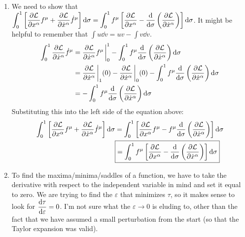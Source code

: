 \documentclass[11pt]{article}
\begin{document}
\begin{enumerate}[label=\alph*)]

\item
We need to show that $\displaystyle{\int_0^1\left[\pdv{\mathcal{L}}{x^\alpha}f^\mu + \pdv{\mathcal{L}}{\dot{x}^\alpha}\dot{f}^\mu\right]\dd{\sigma} = \int_0^1 f^\mu \left[\pdv{\mathcal{L}}{x^\alpha} - \dv{\sigma}\left(\pdv{\mathcal{L}}{\dot{x}^\alpha}\right)\right]\dd{\sigma}}$. It might be helpful to remember that $\displaystyle{\int u\dd{v} = uv -\int v \dd{v}}$.
\begin{align*}
\int_0^1 \pdv{\mathcal{L}}{\dot{x}^\alpha}\dot{f}^\mu & = \pdv{\mathcal{L}}{\dot{x}^\alpha}f^\mu\eval_0^1 - \int_0^1 f^\mu \dv{\sigma}\left(\pdv{\mathcal{L}}{\dot{x}^\alpha}\right)\dd{\sigma}\\
&= \pdv{\mathcal{L}}{\dot{x}^\alpha}\eval_1(0) - \pdv{\mathcal{L}}{\dot{x}^\alpha}\eval_0 (0) - \int_0^1 f^\mu \dv{\sigma}\left(\pdv{\mathcal{L}}{\dot{x}^\alpha}\right)\dd{\sigma}\\
& = - \int_0^1 f^\mu \dv{\sigma}\left(\pdv{\mathcal{L}}{\dot{x}^\alpha}\right)\dd{\sigma}
\end{align*}
Substituting this into the left side of the equation above:
\begin{align*}
\int_0^1\left[\pdv{\mathcal{L}}{x^\alpha}f^\mu + \pdv{\mathcal{L}}{\dot{x}^\alpha}\dot{f}^\mu\right]\dd{\sigma} & = \int_0^1 \left[\pdv{\mathcal{L}}{x^\alpha}f^\mu - f^\mu \dv{\sigma}\left(\pdv{\mathcal{L}}{\dot{x}^\alpha}\right)\right]\dd{\sigma}\\
& \boxed{ = \int_0^1 f^\mu \left[\pdv{\mathcal{L}}{x^\alpha} -\dv{\sigma}\left(\pdv{\mathcal{L}}{\dot{x}^\alpha}\right)\right]\dd{\sigma}}
\end{align*}


\item To find the maxima/minima/saddles of a function, we have to take the derivative with respect to the independent variable in mind and set it equal to zero. We are trying to find the $\varepsilon$ that minimizes $\tau$, so it makes sense to look for $\displaystyle{\dv{\tau}{\varepsilon} = 0}$. I'm not sure what the $\varepsilon \rightarrow 0$ is eluding to, other than the fact that we have assumed a small perturbation from the start (so that the Taylor expansion was valid).



\end{enumerate}
\end{document}
